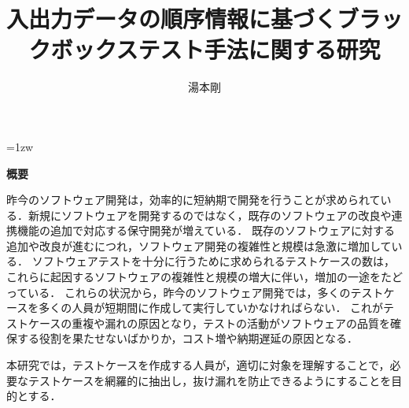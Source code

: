 \documentclass[a4paper,12pt]{jreport}
\title{入出力データの順序情報に基づくブラックボックステスト手法に関する研究}
\author{湯本剛}
\begin{document}
\maketitle
\thispagestyle{empty}
\newpage

\thispagestyle{empty}
\vspace*{20pt plus 1fil}
\parindent=1zw
\noindent
\begin{center}
{\bf 概要}
\vspace{2mm}
\end{center}
\par
昨今のソフトウェア開発は，効率的に短納期で開発を行うことが求められている．新規にソフトウェアを開発するのではなく，既存のソフトウェアの改良や連携機能の追加で対応する保守開発が増えている．
既存のソフトウェアに対する追加や改良が進むにつれ，ソフトウェア開発の複雑性と規模は急激に増加している．
ソフトウェアテストを十分に行うために求められるテストケースの数は，これらに起因するソフトウェアの複雑性と規模の増大に伴い，増加の一途をたどっている．
これらの状況から，昨今のソフトウェア開発では，多くのテストケースを多くの人員が短期間に作成して実行していかなければらない．
これがテストケースの重複や漏れの原因となり，テストの活動がソフトウェアの品質を確保する役割を果たせないばかりか，コスト増や納期遅延の原因となる．

本研究では，テストケースを作成する人員が，適切に対象を理解することで，必要なテストケースを網羅的に抽出し，抜け漏れを防止できるようにすることを目的とする．
\end{document}
